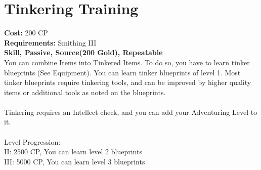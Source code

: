 \section{Tinkering Training}
\textbf{Cost:} 200 CP\\
\textbf{Requirements:} Smithing III\\
\textbf{Skill, Passive, Source(200 Gold), Repeatable}\\
You can combine Items into Tinkered Items. To do so, you have to learn tinker blueprints (See Equipment). You can learn tinker blueprints of level 1. Most tinker blueprints require tinkering tools, and can be improved by higher quality items or additional tools as noted on the blueprints.\\
\\
Tinkering requires an Intellect check, and you can add your Adventuring Level to it.\\
\\
Level Progression:\\
II: 2500 CP, You can learn level 2 blueprints\\
III: 5000 CP, You can learn level 3 blueprints\\